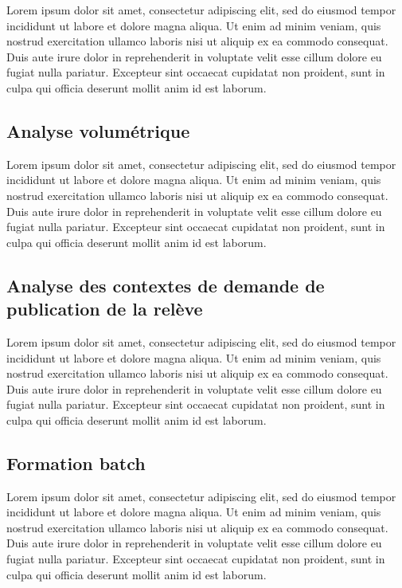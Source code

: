 \documentclass[a4paper, 12pt]{report}
\begin{document}
Lorem ipsum dolor sit amet, consectetur adipiscing elit, sed do eiusmod tempor incididunt ut labore et dolore magna aliqua. Ut enim ad minim veniam, quis nostrud exercitation ullamco laboris nisi ut aliquip ex ea commodo consequat. Duis aute irure dolor in reprehenderit in voluptate velit esse cillum dolore eu fugiat nulla pariatur. Excepteur sint occaecat cupidatat non proident, sunt in culpa qui officia deserunt mollit anim id est laborum.

\subsection{Analyse volumétrique}

Lorem ipsum dolor sit amet, consectetur adipiscing elit, sed do eiusmod tempor incididunt ut labore et dolore magna aliqua. Ut enim ad minim veniam, quis nostrud exercitation ullamco laboris nisi ut aliquip ex ea commodo consequat. Duis aute irure dolor in reprehenderit in voluptate velit esse cillum dolore eu fugiat nulla pariatur. Excepteur sint occaecat cupidatat non proident, sunt in culpa qui officia deserunt mollit anim id est laborum.

\subsection{Analyse des contextes de demande de publication de la relève}

Lorem ipsum dolor sit amet, consectetur adipiscing elit, sed do eiusmod tempor incididunt ut labore et dolore magna aliqua. Ut enim ad minim veniam, quis nostrud exercitation ullamco laboris nisi ut aliquip ex ea commodo consequat. Duis aute irure dolor in reprehenderit in voluptate velit esse cillum dolore eu fugiat nulla pariatur. Excepteur sint occaecat cupidatat non proident, sunt in culpa qui officia deserunt mollit anim id est laborum.

\subsection{Formation batch}

Lorem ipsum dolor sit amet, consectetur adipiscing elit, sed do eiusmod tempor incididunt ut labore et dolore magna aliqua. Ut enim ad minim veniam, quis nostrud exercitation ullamco laboris nisi ut aliquip ex ea commodo consequat. Duis aute irure dolor in reprehenderit in voluptate velit esse cillum dolore eu fugiat nulla pariatur. Excepteur sint occaecat cupidatat non proident, sunt in culpa qui officia deserunt mollit anim id est laborum.
\end{document}
